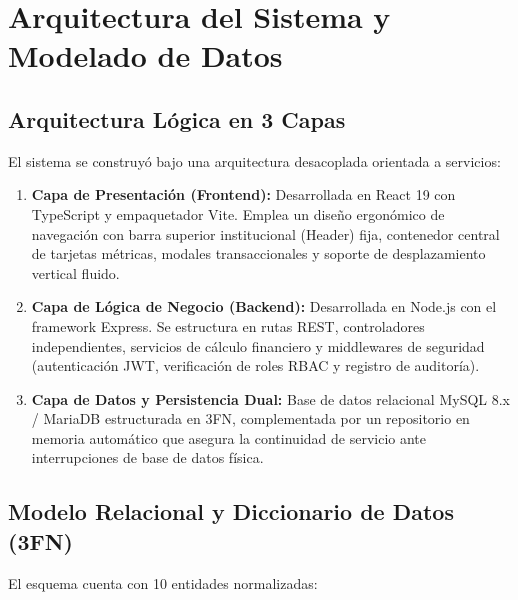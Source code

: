 \documentclass[11pt,letterpaper]{report}
\begin{document}
\chapter{Arquitectura del Sistema y Modelado de Datos}

\section{Arquitectura Lógica en 3 Capas}
El sistema se construyó bajo una arquitectura desacoplada orientada a servicios:
\begin{enumerate}
    \item \textbf{Capa de Presentación (Frontend):} Desarrollada en React 19 con TypeScript y empaquetador Vite. Emplea un diseño ergonómico de navegación con barra superior institucional (Header) fija, contenedor central de tarjetas métricas, modales transaccionales y soporte de desplazamiento vertical fluido.
    \item \textbf{Capa de Lógica de Negocio (Backend):} Desarrollada en Node.js con el framework Express. Se estructura en rutas REST, controladores independientes, servicios de cálculo financiero y middlewares de seguridad (autenticación JWT, verificación de roles RBAC y registro de auditoría).
    \item \textbf{Capa de Datos y Persistencia Dual:} Base de datos relacional MySQL 8.x / MariaDB estructurada en 3FN, complementada por un repositorio en memoria automático que asegura la continuidad de servicio ante interrupciones de base de datos física.
\end{enumerate}

\section{Modelo Relacional y Diccionario de Datos (3FN)}
El esquema cuenta con 10 entidades normalizadas:
\end{document}
